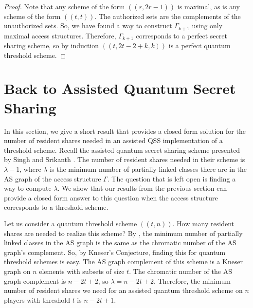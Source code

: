 \begin{proof}
    Note that any scheme of the form $((r,2r-1))$ is maximal, as is any scheme of the form $((t,t))$. The authorized sets are the complements of the unauthorized sets. So, we have found a way to construct $\Gamma_{k+1}$ using only maximal access structures. Therefore, $\Gamma_{k+1}$ corresponds to a perfect secret sharing scheme, so by induction $((t,2t-2+k,k))$ is a perfect quantum threshold scheme.
\end{proof}

\section{Back to Assisted Quantum Secret Sharing}
\label{sec:aqss-and-aqss}

In this section, we give a short result that provides a closed form solution for the number of resident shares needed in an assisted QSS implementation of a threshold scheme. Recall the assisted quantum secret sharing scheme presented by Singh and Srikanth \cite{singh_assisted_2004}. The number of resident shares needed in their scheme is $\lambda-1$, where $\lambda$ is the minimum number of partially linked classes there are in the AS graph of the access structure $\Gamma$. The question that is left open is finding a way to compute $\lambda$. We show that our results from the previous section can provide a closed form answer to this question when the access structure corresponds to a threshold scheme.

Let us consider a quantum threshold scheme $((t,n))$. How many resident shares are needed to realize this scheme? By , the minimum number of partially linked classes in the AS graph is the same as the chromatic number of the AS graph's complement. So, by Kneser's Conjecture, finding this for quantum threshold schemes is easy. The AS graph complement of this scheme is a Kneser graph on $n$ elements with subsets of size $t$. The chromatic number of the AS graph complement is $n-2t+2$, so $\lambda = n-2t+2$. Therefore, the minimum number of resident shares we need for an assisted quantum threshold scheme on $n$ players with threshold $t$ is $n-2t+1$.